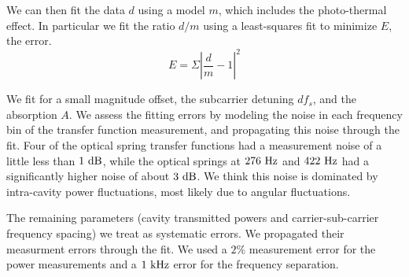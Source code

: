 
We can then fit the data $d$ using a model $m$, which includes the photo-thermal effect. In particular we fit the ratio $d/m$ using a least-squares fit to minimize $E$, the error.
\begin{equation}
E=\Sigma \left|\frac{d}{m}-1\right|^2 
\end{equation}

We fit for a small magnitude offset, the subcarrier detuning $df_s$, and the absorption $A$. We assess the fitting errors by modeling the noise in each frequency bin of the transfer function measurement, and propagating this noise through the fit. Four of the optical spring transfer functions  had a measurement noise of a little less than $1~{\rm dB}$, while the optical springs at $276~{\rm Hz}$ and $422~{\rm Hz}$ had a significantly higher noise of about $3~{\rm dB}$. We think this noise is dominated by intra-cavity power fluctuations, most likely due to angular fluctuations.

The remaining parameters (cavity transmitted powers and carrier-sub-carrier frequency spacing) we treat as systematic errors. We propagated their measurment errors through the fit. We used a $2\%$ measurement error for the power measurements and  a $1~{\rm kHz}$ error for the frequency separation.





